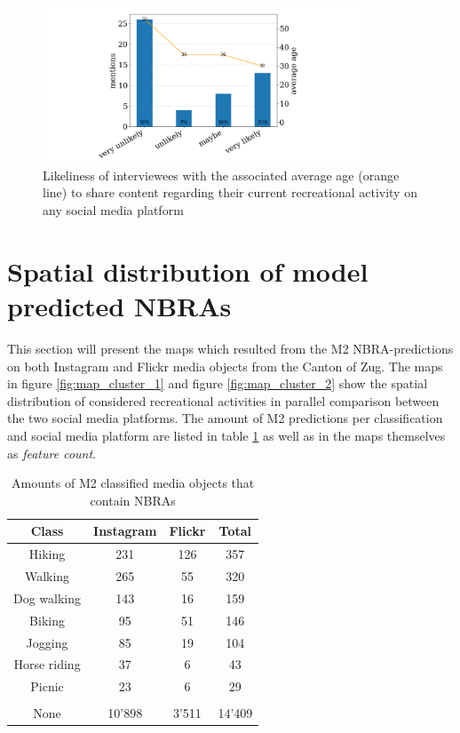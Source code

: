 \begin{figure}[!htb]
   \centering
   \includegraphics[width=0.85\textwidth]{img/likeliness_to_share_SMD.pdf}
   \caption{Likeliness of interviewees with the associated average age (orange line) to share content regarding their current recreational activity on any social media platform}
   \label{fig:likeliness_to_share_SMD}
\end{figure}

\section{Spatial distribution of model predicted NBRAs} \label{results_spatial_dist_model_NBRA}
This section will present the maps which resulted from the M2 NBRA-predictions on both Instagram and Flickr media objects from the Canton of Zug. The maps in figure \ref{fig:map_cluster_1} and figure \ref{fig:map_cluster_2} show the spatial distribution of considered recreational activities in parallel comparison between the two social media platforms. The amount of M2 predictions per classification and social media platform are listed in table \ref{tab:amount_class_NBRAs} as well as in the maps themselves as \textit{feature count}.

\begin{table}[!htb]
\begin{center}
\caption{Amounts of M2 classified media objects that contain NBRAs}\vspace{1ex}
\label{tab:amount_class_NBRAs}
\begin{tabular}{cccc}\hline
Class & Instagram & Flickr & Total\\ \hline
Hiking & 231 & 126 & 357\\
Walking & 265 & 55 & 320\\
Dog walking & 143 & 16 & 159\\
Biking & 95 & 51 & 146\\
Jogging & 85 & 19 & 104\\
Horse riding & 37 & 6 & 43\\
Picnic & 23 & 6 & 29\\
 & & & \\
None & 10'898 & 3'511 & 14'409\\
\hline
\end{tabular}
\end{center}
\end{table}

